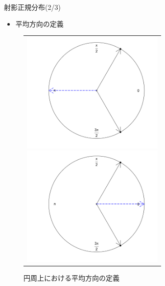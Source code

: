 \documentclass[dvipdfmx]{beamer} %
\begin{document}
\begin{frame}{射影正規分布(2/3)}
\begin{itemize}
	\item 平均方向の定義
\end{itemize}

\begin{figure}[bp]
 \begin{tabular}{c}
 \begin{minipage}{0.5\hsize}
  \begin{center}
   \includegraphics[clip,height= 60mm]{data/sample_False.png}
\caption{算術平均による平均の定義}
\label{sample_mu1}
  \end{center}
 \end{minipage}
 \begin{minipage}{0.5\hsize}
  \begin{center}
 \includegraphics[clip,height= 60mm]{data/sample_True.png}
\caption{円周上における平均方向の定義}
\label{sample_mu2}
  \end{center}
 \end{minipage}
\end{tabular}
\label{sample_mu}
\end{figure}
\end{frame}
\end{document}
